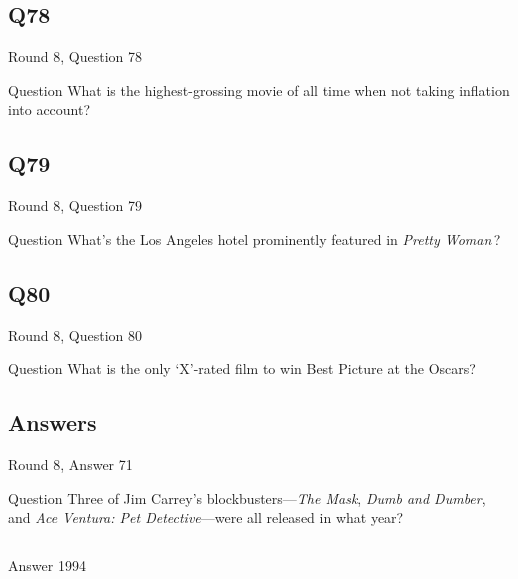 \documentclass[11pt]{beamer}
\begin{document}
\subsection*{Q78}
\begin{frame}[t]{Round 8, Question 78}
  \vspace{2em}
  \begin{block}{Question}
    What is the highest-grossing movie of all time when not taking inflation into account?
  \end{block}
\end{frame}


\subsection*{Q79}
\begin{frame}[t]{Round 8, Question 79}
  \vspace{2em}
  \begin{block}{Question}
    What's the Los Angeles hotel prominently featured in \emph{Pretty Woman}\,?
  \end{block}
\end{frame}


\subsection*{Q80}
\begin{frame}[t]{Round 8, Question 80}
  \vspace{2em}
  \begin{block}{Question}
    What is the only `X'-rated film to win Best Picture at the Oscars?
  \end{block}
\end{frame}

\subsection{Answers}

\begin{frame}[t]{Round 8, Answer 71}
  \vspace{2em}
  \begin{block}{Question}
    Three of Jim Carrey's blockbusters—\emph{The Mask}, \emph{Dumb and Dumber}, and \emph{Ace Ventura: Pet Detective}—were all released in what year?
  \end{block}
  \pause{}
  \begin{columns}[T,totalwidth=\linewidth]
    \begin{column}{0.35\linewidth}
      \begin{block}{Answer}
        1994
      \end{block}
    \end{column}
    \begin{column}{0.6\linewidth}
      \begin{center}
        \texttt{[image: \{Images/140507b-jim-carrey-1994]}.jpg}
      \end{center}
    \end{column}
  \end{columns}
\end{frame}
\end{document}
